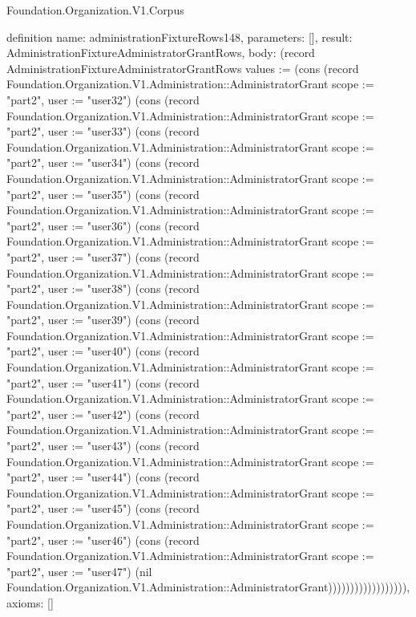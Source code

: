 \begin{lexlean}{Foundation.Organization.V1.Corpus}
\begin{semanticmodule}
definition{
  name: administrationFixtureRows148,
  parameters: [],
  result: AdministrationFixtureAdministratorGrantRows,
  body: (record AdministrationFixtureAdministratorGrantRows {values := (cons (record Foundation.Organization.V1.Administration::AdministratorGrant {scope := "part2", user := "user32"}) (cons (record Foundation.Organization.V1.Administration::AdministratorGrant {scope := "part2", user := "user33"}) (cons (record Foundation.Organization.V1.Administration::AdministratorGrant {scope := "part2", user := "user34"}) (cons (record Foundation.Organization.V1.Administration::AdministratorGrant {scope := "part2", user := "user35"}) (cons (record Foundation.Organization.V1.Administration::AdministratorGrant {scope := "part2", user := "user36"}) (cons (record Foundation.Organization.V1.Administration::AdministratorGrant {scope := "part2", user := "user37"}) (cons (record Foundation.Organization.V1.Administration::AdministratorGrant {scope := "part2", user := "user38"}) (cons (record Foundation.Organization.V1.Administration::AdministratorGrant {scope := "part2", user := "user39"}) (cons (record Foundation.Organization.V1.Administration::AdministratorGrant {scope := "part2", user := "user40"}) (cons (record Foundation.Organization.V1.Administration::AdministratorGrant {scope := "part2", user := "user41"}) (cons (record Foundation.Organization.V1.Administration::AdministratorGrant {scope := "part2", user := "user42"}) (cons (record Foundation.Organization.V1.Administration::AdministratorGrant {scope := "part2", user := "user43"}) (cons (record Foundation.Organization.V1.Administration::AdministratorGrant {scope := "part2", user := "user44"}) (cons (record Foundation.Organization.V1.Administration::AdministratorGrant {scope := "part2", user := "user45"}) (cons (record Foundation.Organization.V1.Administration::AdministratorGrant {scope := "part2", user := "user46"}) (cons (record Foundation.Organization.V1.Administration::AdministratorGrant {scope := "part2", user := "user47"}) (nil Foundation.Organization.V1.Administration::AdministratorGrant)))))))))))))))))}),
  axioms: []
}


\end{semanticmodule}
\end{lexlean}
